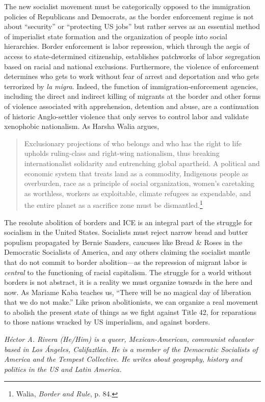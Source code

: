 The new socialist movement must be categorically opposed to the immigration policies of Republicans and Democrats, as the border enforcement regime is not about ``security'' or ``protecting US jobs'' but rather serves as an essential method of imperialist state formation and the organization of people into social hierarchies. Border enforcement is labor repression, which through the aegis of access to state-determined citizenship, establishes patchworks of labor segregation based on racial and national exclusions. Furthermore, the violence of enforcement determines who gets to work without fear of arrest and deportation and who gets terrorized by \emph{la migra}. Indeed, the function of immigration-enforcement agencies, including the direct and indirect killing of migrants at the border and other forms of violence associated with apprehension, detention and abuse, are a continuation of historic Anglo-settler violence that only serves to control labor and validate xenophobic nationalism. As Harsha Walia argues,

\blockquote{Exclusionary projections of who belongs and who has the right to life upholds ruling-class and right-wing nationalism, thus breaking internationalist solidarity and entrenching global apartheid. A political and economic system that treats land as a commodity, Indigenous people as overburden, race as a principle of social organization, women's caretaking as worthless, workers as exploitable, climate refugees as expendable, and the entire planet as a sacrifice zone must be dismantled.\footnote{Walia, \emph{Border and Rule}, p. 84.}}

The resolute abolition of borders and ICE is an integral part of the struggle for socialism in the United States. Socialists must reject narrow bread and butter populism propagated by Bernie Sanders, caucuses like Bread \& Roses in the Democratic Socialists of America, and any others claiming the socialist mantle that do not commit to border abolition---as the repression of migrant labor is \emph{central} to the functioning of racial capitalism. The struggle for a world without borders is not abstract, it is a reality we must organize towards in the here and now. As Mariame Kaba teaches us, ``There will be no magical day of liberation that we do not make.'' Like prison abolitionists, we can organize a real movement to abolish the present state of things as we fight against Title 42, for reparations to those nations wracked by US imperialism, and against borders.

\emph{H\'{e}ctor A. Rivera (He/Him) is a queer, Mexican-American, communist educator based in Los \'{A}ngeles, Califaztl\'{a}n. He is a member of the Democratic Socialists of America and the Tempest Collective. He writes about geography, history and politics in the US and Latin America.}
